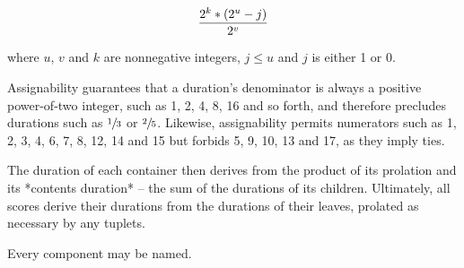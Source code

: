 \begin{equation}
{ 2^k * (2^u - j) \over 2^v }
\end{equation}

\noindent where $u$, $v$ and $k$ are nonnegative integers, $j \leq
u$ and $j$ is either 1 or 0.

Assignability guarantees that a duration's denominator is always a positive
power-of-two integer, such as 1, 2, 4, 8, 16 and so forth, and therefore
precludes durations such as $\sfrac{1}{3}$ or $\sfrac{2}{5}$. Likewise,
assignability permits numerators such as 1, 2, 3, 4, 6, 7, 8, 12, 14 and 15 but
forbids 5, 9, 10, 13 and 17, as they imply ties.

The duration of each container then derives from the product of its prolation
and its *contents duration* -- the sum of the durations of its children.
Ultimately, all scores derive their durations from the durations of their
leaves, prolated as necessary by any tuplets.

Every component may be named.

